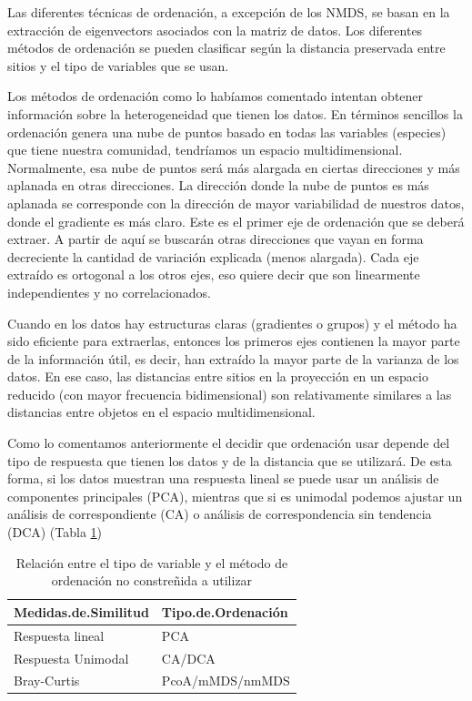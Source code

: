 \documentclass[]{book}
\begin{document}
Las diferentes técnicas de ordenación, a excepción de los NMDS, se basan
en la extracción de eigenvectors asociados con la matriz de datos. Los
diferentes métodos de ordenación se pueden clasificar según la distancia
preservada entre sitios y el tipo de variables que se usan.

Los métodos de ordenación como lo habíamos comentado intentan obtener
información sobre la heterogeneidad que tienen los datos. En términos
sencillos la ordenación genera una nube de puntos basado en todas las
variables (especies) que tiene nuestra comunidad, tendríamos un espacio
multidimensional. Normalmente, esa nube de puntos será más alargada en
ciertas direcciones y más aplanada en otras direcciones. La dirección
donde la nube de puntos es más aplanada se corresponde con la dirección
de mayor variabilidad de nuestros datos, donde el gradiente es más
claro. Este es el primer eje de ordenación que se deberá extraer. A
partir de aquí se buscarán otras direcciones que vayan en forma
decreciente la cantidad de variación explicada (menos alargada). Cada
eje extraído es ortogonal a los otros ejes, eso quiere decir que son
linearmente independientes y no correlacionados.

Cuando en los datos hay estructuras claras (gradientes o grupos) y el
método ha sido eficiente para extraerlas, entonces los primeros ejes
contienen la mayor parte de la información útil, es decir, han extraído
la mayor parte de la varianza de los datos. En ese caso, las distancias
entre sitios en la proyección en un espacio reducido (con mayor
frecuencia bidimensional) son relativamente similares a las distancias
entre objetos en el espacio multidimensional.

Como lo comentamos anteriormente el decidir que ordenación usar depende
del tipo de respuesta que tienen los datos y de la distancia que se
utilizará. De esta forma, si los datos muestran una respuesta lineal se
puede usar un análisis de componentes principales (PCA), mientras que si
es unimodal podemos ajustar un análisis de correspondiente (CA) o
análisis de correspondencia sin tendencia (DCA) (Tabla
\ref{tab:ordenacion})

\begin{table}[t]

\caption{\label{tab:ordenacion}Relación entre el tipo de variable y el método de ordenación no constreñida a utilizar}
\centering
\begin{tabular}{ll}
\toprule
Medidas.de.Similitud & Tipo.de.Ordenación\\
\midrule
Respuesta lineal & PCA\\
Respuesta Unimodal & CA/DCA\\
Bray-Curtis & PcoA/mMDS/nmMDS\\
\bottomrule
\end{tabular}
\end{table}
\end{document}

